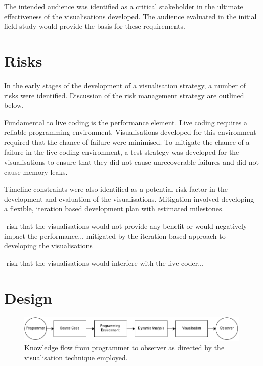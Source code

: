 The intended audience was identified as a critical stakeholder in the ultimate effectiveness of the visualisations developed. The audience evaluated in the initial field study would provide the basis for these requirements. 


\section{Risks}

In the early stages of the development of a visualisation strategy, a number of risks were identified. Discussion of the risk management strategy are outlined below.

Fundamental to live coding is the performance element. Live coding requires a reliable programming environment. Visualisations developed for this environment required that the chance of failure were minimised. To mitigate the chance of a failure in the live coding environment, a test strategy was developed for the visualisations to ensure that they did not cause unrecoverable failures and did not cause memory leaks.

Timeline constraints were also identified as a potential risk factor in the development and evaluation of the visualisations. Mitigation involved developing a flexible, iteration based development plan with estimated milestones.

-risk that the visualisations would not provide any benefit or would negatively impact the performance... mitigated by the iteration based approach to developing the visualisations

-risk that the visualisations would interfere with the live coder...


\section{Design}

\begin{figure}
  \centering \includegraphics[width=\columnwidth]{../images/diagrams/knowledge-flow-initial.pdf}
  \caption{Knowledge flow from programmer to observer as directed by the visualisation technique employed.}
\label{fig:knowledge-flow-initial}
\end{figure}


